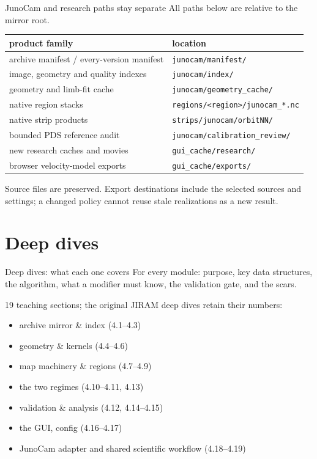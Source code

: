 \documentclass[aspectratio=169,11pt]{beamer}
\newcommand{\currevsec}{}
\newcommand{\revsec}[1]{\gdef\currevsec{#1}}
\begin{document}
\begin{frame}{JunoCam and research paths stay separate}
  \revsec{3.3}
\small All paths below are relative to the mirror root.
  \vspace{0.2cm}
  \begin{tabular}{ll}
    \toprule
    product family & location \\
    \midrule
    archive manifest / every-version manifest & \texttt{junocam/manifest/} \\
    image, geometry and quality indexes & \texttt{junocam/index/} \\
    geometry and limb-fit cache & \texttt{junocam/geometry\_cache/} \\
    native region stacks & \texttt{regions/<region>/junocam\_*.nc} \\
    native strip products & \texttt{strips/junocam/orbitNN/} \\
    bounded PDS reference audit & \texttt{junocam/calibration\_review/} \\
    new research caches and movies & \texttt{gui\_cache/research/} \\
    browser velocity-model exports & \texttt{gui\_cache/exports/} \\
    \bottomrule
  \end{tabular}\par
  \vspace{0.3cm}
  Source files are preserved. Export destinations include the selected sources and settings; a changed policy cannot reuse stale realizations as a new result.
\end{frame}

\section{Deep dives}

\begin{frame}{Deep dives: what each one covers}
  \revsec{4}
  For every module: purpose, key data structures, the algorithm, what a modifier must know, the validation gate, and the scars.
  \vspace{0.3cm}

  19 teaching sections; the original JIRAM deep dives retain their numbers:
  \begin{itemize}
    \item archive mirror \& index (4.1--4.3)
    \item geometry \& kernels (4.4--4.6)
    \item map machinery \& regions (4.7--4.9)
    \item the two regimes (4.10--4.11, 4.13)
    \item validation \& analysis (4.12, 4.14--4.15)
    \item the GUI, config (4.16--4.17)
    \item JunoCam adapter and shared scientific workflow (4.18--4.19)
  \end{itemize}
\end{frame}
\end{document}

